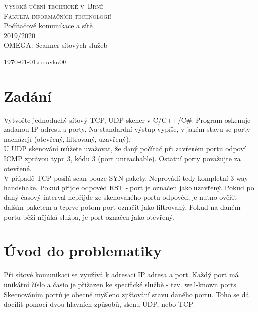 \documentclass[11pt, a4paper]{article}
\begin{document}
\begin{titlepage}

\begin{center}
	\Huge \textsc{Vysoké učení technické v~Brně}\\
	\huge \textsc{Fakulta informačních technologií}\\
		
	\huge Počítačové komunikace a sítě\\
	\huge 2019/2020\\

	\bigskip 
	\bigskip 
	\huge OMEGA: Scanner síťových služeb
\end{center}

{\Large \today \hfill xmusko00}
\end{titlepage}

\section{Zadání}
Vytvořte jednoduchý síťový TCP, UDP skener v C/C++/C\#. Program oskenuje zadanou IP adresu a porty. Na standardní výstup vypíše, v jakém stavu se porty nacházejí (otevřený, filtrovaný, uzavřený).\\

U UDP skenování můžete uvažovat, že daný počítač při zavřeném portu odpoví ICMP zprávou typu 3, kódu 3 (port unreachable). Ostatní porty považujte za otevřené.\\

V případě TCP posílá scan pouze SYN pakety. Neprovádí tedy kompletní 3-way-handshake. Pokud přijde odpověď RST - port je označen jako uzavřený. Pokud po daný časový interval nepřijde ze skenovaného portu odpověď, je nutno ověřit dalším paketem a teprve potom port označit jako filtrovaný. Pokud na daném portu běží nějáká služba, je port označen jako otevřený.\\

\section{Úvod do problematiky}
Při síťové komunikaci se využívá k adresaci IP adresa a port. Každý port má unikátní číslo a často je přižazen ke specifické službě  - tzv. well-known ports. 
Skecnováním portů je obecně myšleno zjišťování stavu daného portu.\cite{wikiPort}
Toho se dá docílit pomocí dvou hlavních způsobů, skenu UDP, nebo TCP.
\end{document}
